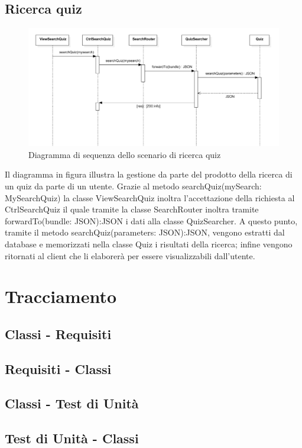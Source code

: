 \documentclass[a4paper, titlepage]{article}
\begin{document}
\newpage
\subsection{Ricerca quiz}
\begin{figure}[!h]
	\centering
	\includegraphics[scale=0.5]{Img/seq-searchquiz.pdf}
	\caption{Diagramma di sequenza dello scenario di ricerca quiz}
\end{figure}
Il diagramma in figura illustra la gestione da parte del prodotto della ricerca di un quiz da parte di un utente. Grazie al metodo searchQuiz(mySearch: MySearchQuiz) la classe ViewSearchQuiz inoltra l'accettazione della richiesta al CtrlSearchQuiz il quale tramite la classe SearchRouter inoltra tramite forwardTo(bundle: JSON):JSON i dati alla classe QuizSearcher. A questo punto, tramite il metodo searchQuiz(parameters: JSON):JSON, vengono estratti dal database e memorizzati nella classe Quiz i risultati della ricerca; infine vengono ritornati al client che li elaborerà per essere visualizzabili dall'utente.

\newpage
\appendix
\section{Tracciamento}

\subsection{Classi - Requisiti}


\subsection{Requisiti - Classi}


\subsection{Classi - Test di Unità}


\subsection{Test di Unità - Classi}

\end{document}
